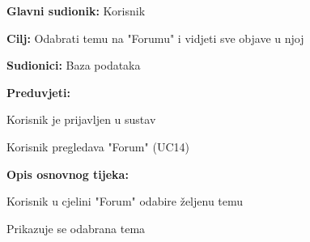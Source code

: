 					\noindent {}
					\begin{packed_item}
	
						\item \textbf{Glavni sudionik: }Korisnik
						\item  \textbf{Cilj:} Odabrati temu na "Forumu" i vidjeti sve objave u njoj
						\item  \textbf{Sudionici:} Baza podataka
						\item  \textbf{Preduvjeti:}
						\item[] \begin{packed_enum}
							\item Korisnik je prijavljen u sustav
							\item Korisnik pregledava "Forum" (UC14)
						\end{packed_enum}
						\item  \textbf{Opis osnovnog tijeka:}
						
						\item[] \begin{packed_enum}
	
							\item Korisnik u cjelini "Forum" odabire željenu temu
							\item Prikazuje se odabrana tema
							
						\end{packed_enum}
						
						
					\end{packed_item}
					\noindent {}
